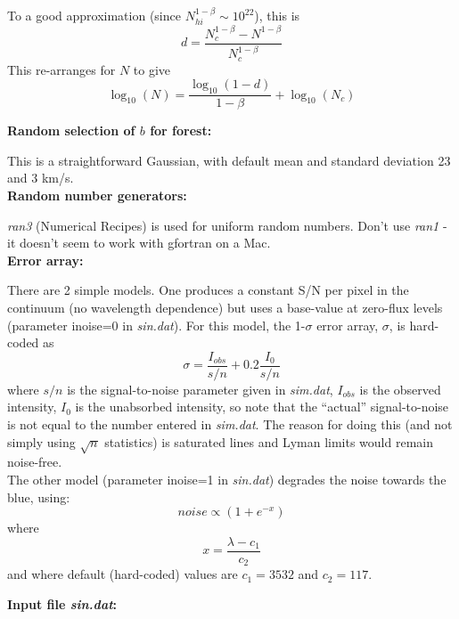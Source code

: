 \documentclass[a4paper,12pt]{article}
\begin{document}
\newpage

To a good approximation (since $N_{hi}^{1-\beta} \sim 10^{22}$), 
this is
\[
d = \frac{N_c^{1-\beta} - N^{1-\beta}}{N_c^{1-\beta}}
\]
This re-arranges for $N$ to give
\[
\log_{10}(N) = \frac{\log_{10}(1-d)}{1-\beta} + \log_{10}(N_c)
\]

{\bf Random selection of $b$ for forest:}

This is a straightforward Gaussian, with default mean and standard deviation
23 and 3 km/s. \\

{\bf Random number generators:}

{\it ran3} (Numerical Recipes) is used for uniform random numbers.  
Don't use {\it ran1} - it doesn't seem to work with gfortran on a Mac. \\

{\bf Error array:}

There are 2 simple models.  One produces a constant S/N per pixel in
the continuum (no wavelength dependence) but uses a base-value
at zero-flux levels (parameter inoise=0 in {\it sin.dat}).
For this model, the 1-$\sigma$ error array, $\sigma$, is hard-coded as
\[
\sigma = \frac{I_{obs}}{s/n} + 0.2\frac{I_0}{s/n}
\]
where $s/n$ is the signal-to-noise parameter given in {\it sim.dat},
$I_{obs}$ is the observed intensity, $I_0$ is the unabsorbed intensity,
so note that the ``actual'' signal-to-noise is not equal to the number
entered in {\it sim.dat}. The reason for doing this (and not simply using
$\sqrt n$ statistics) is saturated lines and Lyman limits would remain
noise-free.\\

The other model (parameter inoise=1 in {\it sin.dat}) degrades the noise 
towards the blue, using:
\[
noise \propto (1+e^{-x})
\]
where
\[
x = \frac{\lambda - c_1}{c_2}
\]
and where default (hard-coded) values are $c_1 = 3532$ and $c_2 = 117$.\\

\newpage

{\bf Input file {\it sin.dat}:}\\
\end{document}
